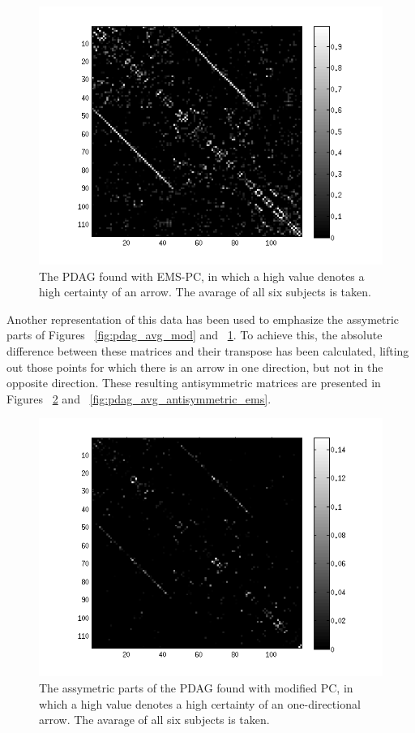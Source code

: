 \documentclass[a4paper, 10pt, english, onecolumn]{article}
\begin{document}
\begin{figure}[h!]
  \centering
  \includegraphics{images/PDAG_avg_expl}
  \caption{The PDAG found with EMS-PC, in which a high value denotes a high certainty of an arrow. The avarage of all six subjects is taken.}
  \label{fig:pdag_avg_ems}
\end{figure}

Another representation of this data has been used to emphasize the assymetric parts of Figures ~\ref{fig:pdag_avg_mod} and ~\ref{fig:pdag_avg_ems}.
To achieve this, the absolute difference between these matrices and their transpose has been calculated, lifting out those points for which there is an arrow in one direction, but not in the opposite direction.
These resulting antisymmetric matrices are presented in Figures ~\ref{fig:pdag_avg_antisymmetric_mod} and ~\ref{fig:pdag_avg_antisymmetric_ems}.

\begin{figure}[h!]
  \centering
  \includegraphics{images/PDAG_avg_antisymmetric_mod}
  \caption{The assymetric parts of the PDAG found with modified PC, in which a high value denotes a high certainty of an one-directional arrow. The avarage of all six subjects is taken.}
  \label{fig:pdag_avg_antisymmetric_mod}
\end{figure}
\end{document}
